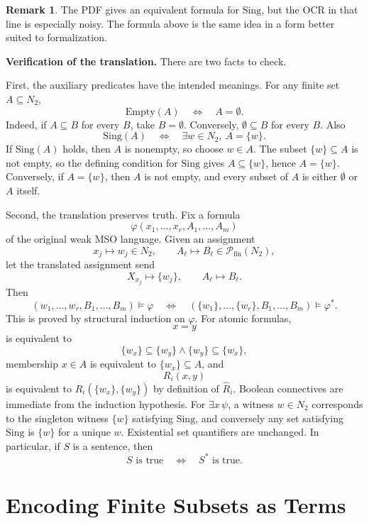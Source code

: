 \documentclass[11pt]{article}
\theoremstyle{definition}
\newtheorem{remark}[theorem]{Remark}
\newcommand{\powfin}{\mathcal P_{\mathrm{fin}}}
\begin{document}
\begin{remark}
The PDF gives an equivalent formula for \(\mathrm{Sing}\), but the OCR in that
line is especially noisy.  The formula above is the same idea in a form better
suited to formalization.
\end{remark}

\medskip
\noindent\textbf{Verification of the translation.}
There are two facts to check.

First, the auxiliary predicates have the intended meanings.  For any finite
set \(A\subseteq N_2\),
\[
  \mathrm{Empty}(A)
  \quad\Longleftrightarrow\quad
  A=\emptyset.
\]
Indeed, if \(A\subseteq B\) for every \(B\), take \(B=\emptyset\).  Conversely,
\(\emptyset\subseteq B\) for every \(B\).  Also
\[
  \mathrm{Sing}(A)
  \quad\Longleftrightarrow\quad
  \exists w\in N_2,\ A=\{w\}.
\]
If \(\mathrm{Sing}(A)\) holds, then \(A\) is nonempty, so choose \(w\in A\).
The subset \(\{w\}\subseteq A\) is not empty, so the defining condition for
\(\mathrm{Sing}\) gives \(A\subseteq\{w\}\), hence \(A=\{w\}\).  Conversely, if
\(A=\{w\}\), then \(A\) is not empty, and every subset of \(A\) is either
\(\emptyset\) or \(A\) itself.

Second, the translation preserves truth.  Fix a formula
\[
  \varphi(x_1,\ldots,x_r,A_1,\ldots,A_m)
\]
of the original weak MSO language.  Given an assignment
\[
  x_j\mapsto w_j\in N_2,\qquad A_\ell\mapsto B_\ell\in\powfin(N_2),
\]
let the translated assignment send
\[
  X_{x_j}\mapsto \{w_j\},\qquad A_\ell\mapsto B_\ell.
\]
Then
\[
  (w_1,\ldots,w_r,B_1,\ldots,B_m)\models\varphi
  \quad\Longleftrightarrow\quad
  (\{w_1\},\ldots,\{w_r\},B_1,\ldots,B_m)\models\varphi^*.       \tag{1}
\]
This is proved by structural induction on \(\varphi\).  For atomic formulas,
\[
  x=y
\]
is equivalent to
\[
  \{w_x\}\subseteq\{w_y\}\wedge \{w_y\}\subseteq\{w_x\},
\]
membership \(x\in A\) is equivalent to \(\{w_x\}\subseteq A\), and
\[
  R_i(x,y)
\]
is equivalent to \(\widehat R_i(\{w_x\},\{w_y\})\) by definition of
\(\widehat R_i\).  Boolean connectives are immediate from the induction
hypothesis.  For \(\exists x\,\psi\), a witness \(w\in N_2\) corresponds to the
singleton witness \(\{w\}\) satisfying \(\mathrm{Sing}\), and conversely any
set satisfying \(\mathrm{Sing}\) is \(\{w\}\) for a unique \(w\).  Existential
set quantifiers are unchanged.  In particular, if \(S\) is a sentence, then
\[
  S\text{ is true}
  \quad\Longleftrightarrow\quad
  S^*\text{ is true}.
\]

\section{Encoding Finite Subsets as Terms}
\end{document}

